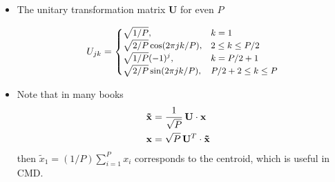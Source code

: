 \begin{frame}
\begin{multicols}{2}
\begin{itemize}
\begin{center}
        \end{center}
        \item The unitary transformation matrix $\mathbf{U}$ for even $P$

            \begin{equation*}
              \small
                U_{jk} =
                \begin{cases}
                \sqrt{1/P}, & k = 1 \\
                \sqrt{2/P}\cos(2\pi jk /P), & 2 \le k \le P/2 \\
                \sqrt{1/P}(-1)^j, & k = P / 2 + 1\\
                \sqrt{2/P}\sin(2\pi jk /P), & P/2 + 2 \le k \le P
                \end{cases}
            \end{equation*}
          \item Note that in many books
            \begin{align*}
                \mathbf{\tilde{x}} &= \frac{1}{\sqrt{P}} \,\mathbf{U} \cdot
                                     \mathbf{x} \cr
                \mathbf{x} &= \sqrt{P} \,\mathbf{U}^T \cdot
                                     \mathbf{\tilde{x}}
            \end{align*}
            then $\tilde{x}_1 = (1/P)\sum_{i=1}^P x_i$ corresponds to the
            centroid, which is useful in CMD.

    \end{itemize}
    
  \end{multicols}


\end{frame}
